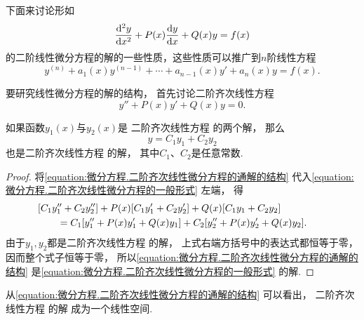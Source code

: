 下面来讨论形如
\begin{equation}\label{equation:微分方程.二阶非齐次线性微分方程的一般形式}
	\dv[2]{y}{x} + P(x) \dv{y}{x} + Q(x) y = f(x)
\end{equation}
的二阶线性微分方程的解的一些性质，这些性质可以推广到\(n\)阶线性方程
\begin{equation}\label{equation:微分方程.n阶线性微分方程的一般形式}
	y^{(n)} + a_1(x) y^{(n-1)} + \dotsb + a_{n-1}(x) y' + a_n(x) y = f(x).
\end{equation}

要研究线性微分方程的解的结构，
首先讨论二阶齐次线性方程\begin{equation}\label{equation:微分方程.二阶齐次线性微分方程的一般形式}
	y'' + P(x) y' + Q(x) y = 0.
\end{equation}

\begin{theorem}
如果函数\(y_1(x)\)与\(y_2(x)\)是
二阶齐次线性方程  的两个解，
那么\begin{equation}\label{equation:微分方程.二阶齐次线性微分方程的通解的结构}
	y = C_1 y_1 + C_2 y_2
\end{equation}
也是二阶齐次线性方程  的解，
其中\(C_1\)、\(C_2\)是任意常数.
\begin{proof}
将\cref{equation:微分方程.二阶齐次线性微分方程的通解的结构}
代入\cref{equation:微分方程.二阶齐次线性微分方程的一般形式} 左端，
得\begin{align*}
	&\hspace{-20pt}
	[C_1 y_1'' + C_2 y_2'']
	+ P(x) [C_1 y_1' + C_2 y_2']
	+ Q(x) [C_1 y_1 + C_2 y_2] \\
	&= C_1 [y_1'' + P(x) y_1' + Q(x) y_1]
	+ C_2 [y_2'' + P(x) y_2' + Q(x) y_2].
\end{align*}
由于\(y_1,y_2\)都是二阶齐次线性方程  的解，
上式右端方括号中的表达式都恒等于零，
因而整个式子恒等于零，
所以\cref{equation:微分方程.二阶齐次线性微分方程的通解的结构}
是\cref{equation:微分方程.二阶齐次线性微分方程的一般形式} 的解.
\end{proof}
\end{theorem}
从\cref{equation:微分方程.二阶齐次线性微分方程的通解的结构} 可以看出，
二阶齐次线性方程  的解
成为一个线性空间.

